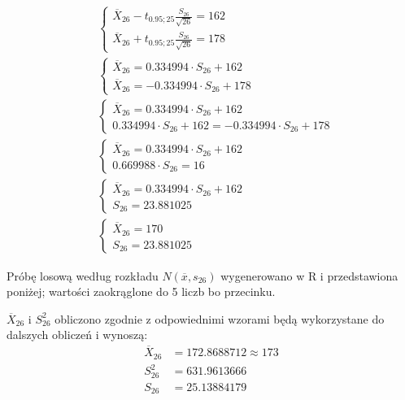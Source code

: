 \documentclass{article}
\begin{document}
\begin{align*}
& \left\{ \begin{array}{c} \overline{X}_{26} - t_{0.95;25} \frac{S_{26}}{\sqrt{26}}  = 162\\
 \overline{X}_{26} + t_{0.95;25} \frac{S_{26}}{\sqrt{26}} = 178\end{array} \right. \\
& \left\{ \begin{array}{c} \overline{X}_{26} =  0.334994 \cdot S_{26} + 162\\
 \overline{X}_{26} = -0.334994 \cdot S_{26} + 178\end{array} \right. \\
& \left\{ \begin{array}{c} \overline{X}_{26} =  0.334994 \cdot S_{26} + 162\\
  0.334994 \cdot S_{26} + 162 = -0.334994 \cdot S_{26} + 178\end{array} \right. \\
& \left\{ \begin{array}{c} \overline{X}_{26} =  0.334994 \cdot S_{26} + 162\\
  0.669988 \cdot S_{26} = 16\end{array} \right. \\
& \left\{ \begin{array}{c} \overline{X}_{26} =  0.334994 \cdot S_{26} + 162\\
  S_{26} = 23.881025 \end{array} \right. \\
& \left\{ \begin{array}{c} \overline{X}_{26} = 170\\
  S_{26} = 23.881025 \end{array} \right.
\end{align*}

Próbę losową według rozkładu $N(\overline{x},s_{26})$ wygenerowano w R i przedstawiona poniżej; wartości zaokrąglone do 5 liczb bo przecinku.
\begin{center}
\end{center}

$\overline{X}_{26}$ i $S_{26}^2$ obliczono zgodnie z odpowiednimi wzorami będą wykorzystane do dalszych obliczeń i wynoszą:
\begin{align*}
\overline{X}_{26} & = 172.8688712 \approx 173 \\
S_{26}^2 & = 631.9613666 \\
S_{26} & = 25.13884179
\end{align*}
\end{document}
